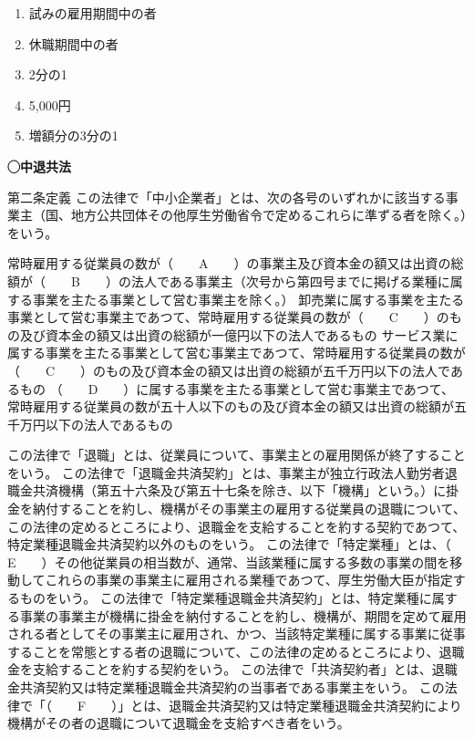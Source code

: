 \begin{answerbox}
  \begin{enumerate}[A:]
    \item 試みの雇用期間中の者
    \item 休職期間中の者
    \item 2分の1
    \item 5,000円
    \item 増額分の3分の1
  \end{enumerate}
\end{answerbox}


\begin{fillblank}[数理人試験 H29 問題1 設問6]
  \noindent \textbf{◯中退共法}
  \begin{lawstructure}
    \begin{lawarticle}{第二条}{定義}
      この法律で「中小企業者」とは、次の各号のいずれかに該当する事業主（国、地方公共団体その他厚生労働省令で定めるこれらに準ずる者を除く。）をいう。

      常時雇用する従業員の数が（　　A　　）の事業主及び資本金の額又は出資の総額が（　　B　　）の法人である事業主（次号から第四号までに掲げる業種に属する事業を主たる事業として営む事業主を除く。）
      卸売業に属する事業を主たる事業として営む事業主であつて、常時雇用する従業員の数が（　　C　　）のもの及び資本金の額又は出資の総額が一億円以下の法人であるもの
      サービス業に属する事業を主たる事業として営む事業主であつて、常時雇用する従業員の数が（　　C　　）のもの及び資本金の額又は出資の総額が五千万円以下の法人であるもの
      （　　D　　）に属する事業を主たる事業として営む事業主であつて、常時雇用する従業員の数が五十人以下のもの及び資本金の額又は出資の総額が五千万円以下の法人であるもの

      この法律で「退職」とは、従業員について、事業主との雇用関係が終了することをいう。
      この法律で「退職金共済契約」とは、事業主が独立行政法人勤労者退職金共済機構（第五十六条及び第五十七条を除き、以下「機構」という。）に掛金を納付することを約し、機構がその事業主の雇用する従業員の退職について、この法律の定めるところにより、退職金を支給することを約する契約であつて、特定業種退職金共済契約以外のものをいう。
      この法律で「特定業種」とは、（　　E　　）その他従業員の相当数が、通常、当該業種に属する多数の事業の間を移動してこれらの事業の事業主に雇用される業種であつて、厚生労働大臣が指定するものをいう。
    この法律で「特定業種退職金共済契約」とは、特定業種に属する事業の事業主が機構に掛金を納付することを約し、機構が、期間を定めて雇用される者としてその事業主に雇用され、かつ、当該特定業種に属する事業に従事することを常態とする者の退職について、この法律の定めるところにより、退職金を支給することを約する契約をいう。
    この法律で「共済契約者」とは、退職金共済契約又は特定業種退職金共済契約の当事者である事業主をいう。
    この法律で「（　　F　　）」とは、退職金共済契約又は特定業種退職金共済契約により機構がその者の退職について退職金を支給すべき者をいう。
    \end{lawarticle}
  \end{lawstructure}
\end{fillblank}

